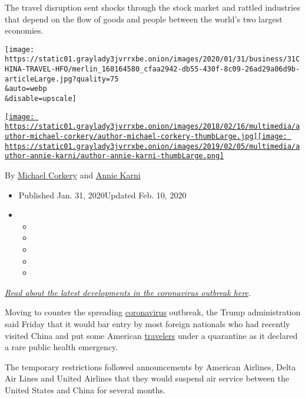 The travel disruption sent shocks through the stock market and rattled
industries that depend on the flow of goods and people between the
world's two largest economies.

\texttt{[image: https://static01.graylady3jvrrxbe.onion/images/2020/01/31/business/31CHINA-TRAVEL-HFO/merlin\_168164580\_cfaa2942-db55-430f-8c09-26ad29a06d9b-articleLarge.jpg?quality=75\\\&auto=webp\\\&disable=upscale]}

\href{https://www.nytimes3xbfgragh.onion/by/michael-corkery}{\texttt{[image: https://static01.graylady3jvrrxbe.onion/images/2018/02/16/multimedia/author-michael-corkery/author-michael-corkery-thumbLarge.jpg]}}\href{https://www.nytimes3xbfgragh.onion/by/annie-karni}{\texttt{[image: https://static01.graylady3jvrrxbe.onion/images/2019/02/05/multimedia/author-annie-karni/author-annie-karni-thumbLarge.png]}}

By \href{https://www.nytimes3xbfgragh.onion/by/michael-corkery}{Michael
Corkery} and
\href{https://www.nytimes3xbfgragh.onion/by/annie-karni}{Annie Karni}

\begin{itemize}
\item
  Published Jan. 31, 2020Updated Feb. 10, 2020
\item
  \begin{itemize}
  \item
  \item
  \item
  \item
  \item
  \end{itemize}
\end{itemize}

\href{https://www.nytimes3xbfgragh.onion/2020/02/02/world/asia/china-coronavirus.html}{\emph{Read
about the latest developments in the coronavirus outbreak here}}\emph{.}

Moving to counter the spreading
\href{https://www.nytimes3xbfgragh.onion/2020/02/10/business/china-coronavirus-philippines-travel.html}{coronavirus}
outbreak, the Trump administration said Friday that it would bar entry
by most foreign nationals who had recently visited China and put some
American
\href{https://www.nytimes3xbfgragh.onion/2020/02/10/business/china-coronavirus-philippines-travel.html}{travelers}
under a quarantine as it declared a rare public health emergency.

The temporary restrictions followed announcements by American Airlines,
Delta Air Lines and United Airlines that they would suspend air service
between the United States and China for several months.

